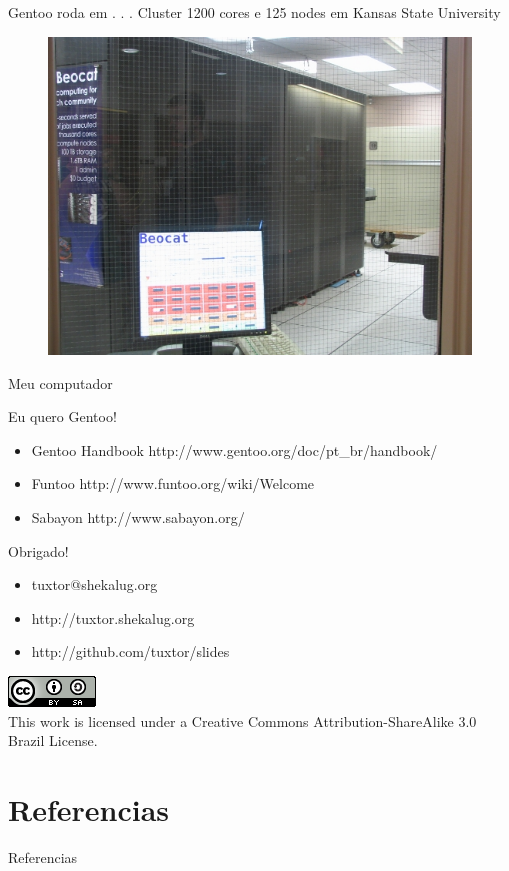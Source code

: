 \documentclass{beamer}
\begin{document}
\begin{frame}{Gentoo roda em . . .}
Cluster 1200 cores e 125 nodes em Kansas State University \cite{GenClu2012}
\begin{figure}[tbph]
\centering
\includegraphics[width=0.4\linewidth]{./beocat}
\label{fig:beocat}
\end{figure}
Meu computador
\end{frame}

\begin{frame}{Eu quero Gentoo!}
\begin{itemize}
\item Gentoo Handbook http://www.gentoo.org/doc/pt_br/handbook/
\item Funtoo http://www.funtoo.org/wiki/Welcome
\item Sabayon http://www.sabayon.org/
\end{itemize}
\end{frame}


\begin{frame}{Obrigado!}
\begin{itemize}
\item tuxtor@shekalug.org
\item http://tuxtor.shekalug.org
\item http://github.com/tuxtor/slides
\end{itemize}
\begin{center}
\includegraphics[width=0.1\linewidth]{./cclogo}
\\
This work is licensed under a Creative Commons Attribution-ShareAlike 3.0 Brazil License.
\end{center}
\end{frame}

\section{Referencias}
\begin{frame}[allowframebreaks]{Referencias}
    
    
\end{frame}
\end{document}
